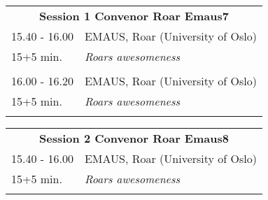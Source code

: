 \begin{longtable}[h!]
\begin{tabular}{p{3cm}p{13cm}}
\multicolumn{2}{c}{{\bf Session 1  \hfill Convenor Roar Emaus7}}\\ 
 15.40 - 16.00 & EMAUS, Roar (University of Oslo)\\ 
15+5 min. & {\it Roars awesomeness}\\ 
 & \\ 16.00 - 16.20 & EMAUS, Roar (University of Oslo)\\ 
15+5 min. & {\it Roars awesomeness}\\ 
 & \\ \end{tabular}
\end{longtable}

\hspace*{-10cm}
\begin{longtable}[h!]
\begin{tabular}{p{3cm}p{13cm}}
\multicolumn{2}{c}{{\bf Session 2  \hfill Convenor Roar Emaus8}}\\ 
 15.40 - 16.00 & EMAUS, Roar (University of Oslo)\\ 
15+5 min. & {\it Roars awesomeness}\\ 
 & \\ \end{tabular}
\end{longtable}

\hspace*{-10cm}
